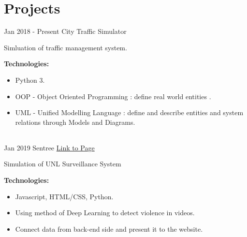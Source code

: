 \documentclass[letterpaper]{twentysecondcv} %
\begin{document}
\section{Projects}
\begin{twenty}
	\twentyitem
    	{Jan 2018 - }
		{Present}
        {City Traffic Simulator}
        {} %
        {}
        {
       	Simluation of traffic management system.
       	
       	\textbf{Technologies:}
        {\begin{itemize}
        \item Python 3.
        \item OOP - Object Oriented Programming : define real world entities .
        \item UML - Unified Modelling Language : define and describe entities and system relations
        through Models and Diagrams.
		\end{itemize}}
        }
    \\
        \twentyitem
    	{Jan 2019}
		{}
        {Sentree}
        {\href{https://datduyng.github.io/cornhack2019/}{Link to Page}} %
        {}
        {
       	Simulation of UNL Surveillance System
       	
       	\textbf{Technologies:}
        {\begin{itemize}
        \item Javascript, HTML/CSS, Python.
        \item Using method of Deep Learning to detect violence in videos.
        \item Connect data from back-end side and present it to the website.
		\end{itemize}}
        }
        \\

\end{twenty}


\end{document}
